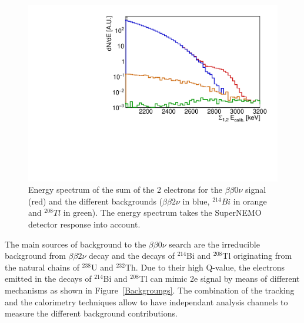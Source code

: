 \documentclass[main.tex]{subfiles}
\begin{document}
\begin{figure}[h!]
\begin{center}
\includegraphics[scale=0.60]{pictures/Chap5/tot_energy_spectrum.pdf}
\caption{Energy spectrum of the sum of the 2 electrons for the $\beta \beta 0 \nu$ signal (red) and the different backgrounds ($\beta \beta 2 \nu$ in blue, $^{214}Bi$ in orange and $^{208}Tl$ in green). The energy spectrum takes the SuperNEMO detector response into account.}
\label{energySpectrum}
\end{center}
\end{figure}


\noindent The main sources of background to the $\beta \beta 0 \nu$ search are the irreducible background from $\beta \beta 2 \nu$ decay and the decays of $^{214}$Bi and $^{208}$Tl originating from the natural chains of $^{238}$U and $^{232}$Th. Due to their high Q-value, the electrons emitted in the decays of $^{214}$Bi and $^{208}$Tl can mimic 2e signal by means of different mechanisms as
shown in Figure~\ref{Backgroungs}. The combination of the tracking and the calorimetry techniques allow to have independant analysis channels to measure the different background contributions.
\end{document}
